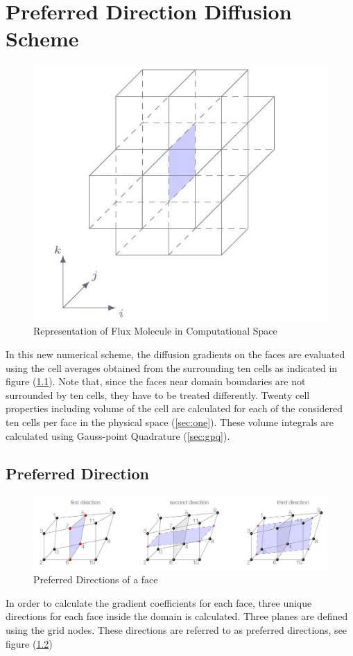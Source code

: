 \chapter{Preferred Direction Diffusion Scheme}
\label{chap:pdds}
\begin{figure}[h]
\centering
\includegraphics{figure/governing/fluxmolecule.JPG}
\caption{Representation of Flux Molecule in Computational Space}
\label{fig:fm}
\end{figure}
\hspace{0.25cm}In this new numerical scheme, the diffusion gradients on the faces are evaluated using the cell averages obtained from the surrounding ten cells as indicated in figure (\ref{fig:fm}). Note that, since the faces near domain boundaries are not surrounded by ten cells, they have to be treated differently. Twenty cell properties including volume of the cell are calculated for each of the considered ten cells per face in the physical space (\ref{sec:one}). These volume integrals are calculated using Gauss-point Quadrature (\ref{sec:gpq}).
\section{Preferred Direction}
\begin{figure}[h]
\centering
\includegraphics[width=1\linewidth]{figure/governing/pd.JPG}
\caption{Preferred Directions of a face}
\label{fig:pd}
\end{figure}
\hspace{0.25cm} In order to calculate the gradient coefficients for each face, three unique directions for each face inside the domain is calculated. Three planes are defined using the grid nodes. These directions are referred to as preferred directions, see figure (\ref{fig:pd})
      
